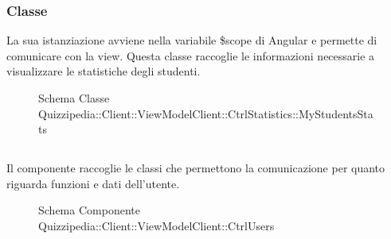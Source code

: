 \subsubsection{Classe }
La sua istanziazione avviene nella variabile \$scope di Angular e permette di comunicare con la view. Questa classe raccoglie le informazioni necessarie a visualizzare le statistiche degli studenti.
\begin{figure}[H]
\centering
\noindent{}
\caption[Schema Classe MyStudentsStats]{Schema Classe Quizzipedia::Client::ViewModelClient::CtrlStatistics::MyStudentsStats}
\end{figure}
\subsection{}
Il componente raccoglie le classi che permettono la comunicazione per quanto riguarda funzioni e dati dell'utente.
\begin{figure}[H]
\centering
\noindent{}
\caption[Schema Componente Quizzipedia::Client::ViewModelClient::CtrlUsers]{Schema Componente Quizzipedia::Client::ViewModelClient::CtrlUsers}
\end{figure}
